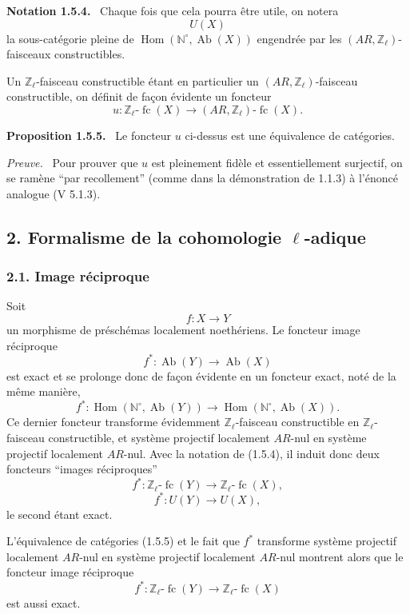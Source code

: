 \documentclass[11pt]{article}
\newenvironment{statement}[1]{\par\medskip\noindent\textbf{#1.}\ }{\par\medskip}
\newenvironment{prooftext}[1][Proof]{\par\noindent\emph{#1.}\ }{\par\medskip}
\DeclareMathOperator{\Hom}{Hom}
\providecommand{\Hom}{\operatorname{Hom}}
\providecommand{\Ab}{\operatorname{Ab}}
\providecommand{\fc}{\operatorname{fc}}
\providecommand{\Ab}{\operatorname{Ab}}
\begin{document}
\begin{statement}{Notation 1.5.4}
Chaque fois que cela pourra être utile, on notera
\[
U(X)
\]
la sous-catégorie pleine de \(\Hom(\mathbb N^\circ,\Ab(X))\) engendrée par les \((AR,\mathbb Z_\ell)\)-faisceaux constructibles.
\end{statement}

Un \(\mathbb Z_\ell\)-faisceau constructible étant en particulier un \((AR,\mathbb Z_\ell)\)-faisceau constructible, on définit de façon évidente un foncteur
\[
u:\mathbb Z_\ell\text{-}\fc(X)\longrightarrow (AR,\mathbb Z_\ell)\text{-}\fc(X).
\]

\begin{statement}{Proposition 1.5.5}
Le foncteur \(u\) ci-dessus est une équivalence de catégories.
\end{statement}

\begin{prooftext}[Preuve]
Pour prouver que \(u\) est pleinement fidèle et essentiellement surjectif, on se ramène ``par recollement'' (comme dans la démonstration de 1.1.3) à l'énoncé analogue (V 5.1.3).
\end{prooftext}

\subsection*{2. Formalisme de la cohomologie \(\ell\)-adique}

\subsubsection*{2.1. Image réciproque}

Soit
\[
f:X\longrightarrow Y
\]
un morphisme de préschémas localement noethériens. Le foncteur image réciproque
\[
f^*:\Ab(Y)\longrightarrow \Ab(X)
\]
est exact et se prolonge donc de façon évidente en un foncteur exact, noté de la même manière,
\[
f^*:\Hom(\mathbb N^\circ,\Ab(Y))\longrightarrow \Hom(\mathbb N^\circ,\Ab(X)).
\]
Ce dernier foncteur transforme évidemment \(\mathbb Z_\ell\)-faisceau constructible en \(\mathbb Z_\ell\)-faisceau constructible, et système projectif localement \(AR\)-nul en système projectif localement \(AR\)-nul. Avec la notation de (1.5.4), il induit donc deux foncteurs ``images réciproques''
\[
f^*:\mathbb Z_\ell\text{-}\fc(Y)\longrightarrow \mathbb Z_\ell\text{-}\fc(X),
\]
\[
f^*:U(Y)\longrightarrow U(X),
\]
le second étant exact.

L'équivalence de catégories (1.5.5) et le fait que \(f^*\) transforme système projectif localement \(AR\)-nul en système projectif localement \(AR\)-nul montrent alors que le foncteur image réciproque
\[
f^*:\mathbb Z_\ell\text{-}\fc(Y)\longrightarrow \mathbb Z_\ell\text{-}\fc(X)
\]
est aussi exact.
\end{document}

